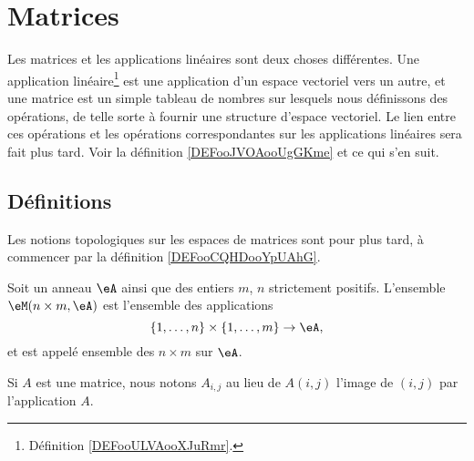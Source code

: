 
\section{Matrices}

Les matrices et les applications linéaires sont deux choses différentes. Une application linéaire\footnote{Définition \ref{DEFooULVAooXJuRmr}.} est une application d'un espace vectoriel vers un autre, et une matrice est un simple tableau de nombres sur lesquels nous définissons des opérations, de telle sorte à fournir une structure d'espace vectoriel. Le lien entre ces opérations et les opérations correspondantes sur les applications linéaires sera fait plus tard. Voir la définition \ref{DEFooJVOAooUgGKme} et ce qui s'en suit.

\subsection{Définitions}

Les notions topologiques sur les espaces de matrices sont pour plus tard, à commencer par la définition \ref{DEFooCQHDooYpUAhG}.

\begin{definition}
	Soit un anneau \( \eA\) ainsi que des entiers \( m\), \( n\) strictement positifs. L'ensemble \( \eM(n\times m,\eA)\) est l'ensemble des applications
	\begin{equation}
		\{ 1,\ldots, n \}\times \{ 1,\ldots, m \}\to \eA,
	\end{equation}
	et est appelé ensemble des  \(n\times m\) sur \( \eA \).
\end{definition}
Si \( A\) est une matrice, nous notons \( A_{i,j}\) au lieu de \( A(i,j)\) l'image de \( (i,j)\) par l'application \( A\).


